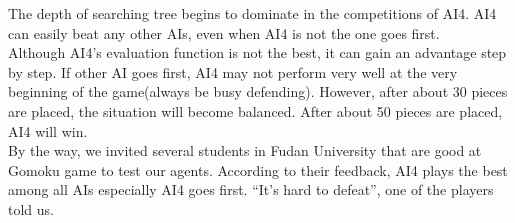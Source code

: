 \documentclass[12pt,a4paper]{article}
\begin{document}
\begin{itemize}
The depth of searching tree begins to dominate in the competitions of AI4. AI4 can easily beat any other AIs, even when AI4 is not the one goes first. \\
Although AI4's evaluation function is not the best, it can gain an advantage step by step. If other AI goes first, AI4 may not perform very well at the very beginning of the game(always be busy defending). However, after about 30 pieces are placed, the situation will become balanced. After about 50 pieces are placed, AI4 will win.\\
By the way, we invited several students in Fudan University that are good at Gomoku game to test our agents. According to their feedback, AI4 plays the best among all AIs especially AI4 goes first. ``It's hard to defeat'', one of the players told us.
\end{itemize}




\end{document}
